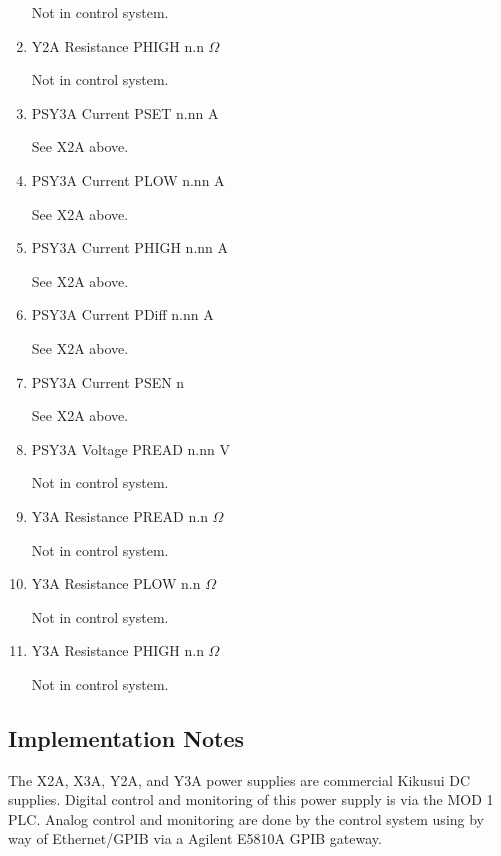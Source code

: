 \documentclass[11pt]{book}		%
\begin{document}
\begin{enumerate}
\color{red}
Not in control system.
\color{black}

 \item Y2A Resistance PHIGH n.n $\Omega$

\color{red}
Not in control system.
\color{black}

 \item PSY3A Current PSET  n.nn A

\color{red}
See X2A above.
\color{black}

 \item PSY3A Current PLOW  n.nn A

\color{red}
See X2A above.
\color{black}

 \item PSY3A Current PHIGH n.nn A

\color{red}
See X2A above.
\color{black}

 \item PSY3A Current PDiff n.nn A

\color{red}
See X2A above.
\color{black}

 \item PSY3A Current PSEN  n

\color{red}
See X2A above.
\color{black}

 \item PSY3A Voltage PREAD n.nn V

\color{red}
Not in control system.
\color{black}

 \item Y3A Resistance PREAD n.n $\Omega$

\color{red}
Not in control system.
\color{black}

 \item Y3A Resistance PLOW n.n $\Omega$

\color{red}
Not in control system.
\color{black}

 \item Y3A Resistance PHIGH n.n $\Omega$

\color{red}
Not in control system.
\color{black}

\end{enumerate}

\subsection{Implementation Notes} \label{sect:cyc-equip-ctl-beamline-sm23a-implementation}

The X2A, X3A, Y2A, and Y3A power supplies are commercial Kikusui DC supplies.  Digital control and monitoring of this power supply is via the MOD 1 PLC.  Analog control and monitoring are done by the control system using by way of Ethernet/GPIB via a Agilent E5810A GPIB gateway.
\end{document}
